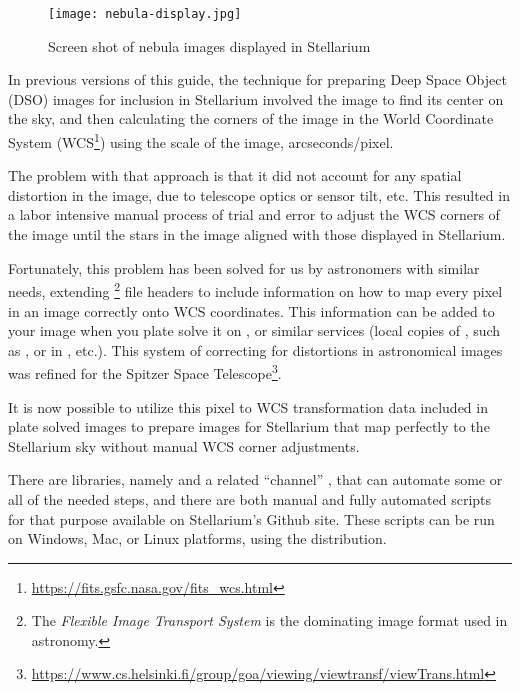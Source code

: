 \begin{figure}[htb]
\centering\texttt{[image: nebula-display.jpg]}
\caption{Screen shot of nebula images displayed in Stellarium}
\label{fig:dso:adding_images}
\end{figure}

\noindent In previous versions of this guide, the technique for preparing Deep
Space Object (DSO) images for inclusion in Stellarium involved  the image to find its center on the sky, and then calculating
the corners of the image in the World Coordinate System (WCS\footnote{%
\url{https://fits.gsfc.nasa.gov/fits_wcs.html}}) using the scale of the
image, arcseconds/pixel.


The problem with that approach is that it did not account for any
spatial distortion in the image, due to telescope optics or sensor
tilt, etc. This resulted in a labor intensive manual process of trial
and error to adjust the WCS corners of the image until the stars in
the image aligned with those displayed in Stellarium.

Fortunately, this problem has been solved for us by astronomers with
similar needs, extending \footnote{The \emph{Flexible Image
    Transport System} is the dominating image format used in
  astronomy.} file headers to include information on how
to map every pixel in an image correctly onto WCS coordinates. This
information can be added to your image when you plate solve it on
, or similar services (local copies of
, such as , or in
, etc.). This system of correcting for distortions
in astronomical images was refined for the Spitzer
Space Telescope\footnote{\url{https://www.cs.helsinki.fi/group/goa/viewing/viewtransf/viewTrans.html}}.

It is now possible to utilize this pixel to WCS transformation data
included in plate solved images to prepare images for Stellarium that
map perfectly to the Stellarium sky without manual WCS corner
adjustments.

There are  libraries, namely  and a
related ``channel'' , that can automate some or
all of the needed steps, and there are both manual and fully automated
scripts for that purpose available on Stellarium's Github site. These
scripts can be run on Windows, Mac, or Linux platforms, using the
 distribution.

